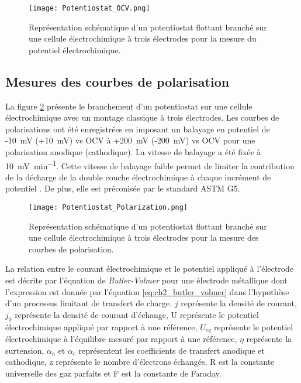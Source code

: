 \begin{refsection}
    \begin{figure}[H]
        \centering
            \texttt{[image: Potentiostat\_OCV.png]}
        \caption{Représentation schématique d'un potentiostat flottant branché sur une cellule électrochimique à trois électrodes
        pour la mesure du potentiel électrochimique.}
        \label{fig:ch2_potentiostat_OCV}
    \end{figure}


    \subsection{Mesures des courbes de polarisation}\label{subsec:ch2_Tafel}

    La figure \ref{fig:ch2_potentiostat_Polarization} présente le branchement d'un potentiostat sur une cellule électrochimique
    avec un montage classique à trois électrodes. Les courbes de polarisations ont été enregistrées en imposant un balayage en
    potentiel de -10~mV (+10~mV) vs OCV à +200~mV (-200~mV)
    vs OCV pour une polarisation anodique (cathodique). La vitesse de balayage a été fixée à
    \SI{10}{\milli\volt\per\minute}. Cette vitesse de balayage faible permet de limiter la contribution de la décharge
    de la double couche électrochimique à chaque incrément de potentiel \citep{Talbot1998, Roberge1999, Kelly2003, Perez2004}.
    De plus, elle est préconisée par le standard ASTM G5.

    \begin{figure}[H]
        \centering
            \texttt{[image: Potentiostat\_Polarization.png]}
        \caption{Représentation schématique d'un potentiostat flottant branché sur une cellule électrochimique à trois
        électrodes pour la mesure des courbes de polarisation.}
        \label{fig:ch2_potentiostat_Polarization}
    \end{figure}


    La relation entre le courant électrochimique et le potentiel appliqué à l'électrode est décrite par l'équation
    de \emph{Butler-Volmer} pour une électrode métallique dont
    l'expression est donnée par l'équation \ref{eq:ch2_butler_volmer} dans l'hypothèse d'un processus limitant de transfert de charge. 
    $j$ représente la densité de courant, $j_0$ représente la densité de courant d'échange, U représente le potentiel
    électrochimique appliqué par rapport à une référence, $U_{eq}$ représente le potentiel électrochimique à
    l'équilibre mesuré par rapport à une référence, $\eta$ représente la surtension, $\alpha _a$ et $\alpha _c$ représentent les coefficients de
    transfert anodique et cathodique, z représente le nombre d'électrons échangés, R est la constante universelle
    des gaz parfaits et F est la constante de Faraday. 



\end{refsection}
